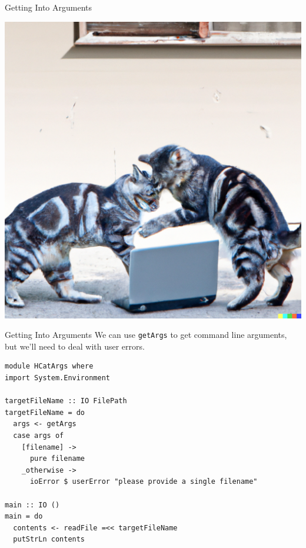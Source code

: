 \documentclass[10pt, presentation, colorlinks]{beamer}
\begin{document}
\begin{frame}[label={sec:org626e439}]{Getting Into Arguments}
\begin{center}
\includegraphics[height=0.6\textheight]{./img/arguments.png}
\end{center}
\end{frame}

\begin{frame}[label={sec:orgaeb0a64},fragile]{Getting Into Arguments}
 We can use \alert{\texttt{getArgs}} to get command line arguments, but we'll need to
deal with user errors.

\bigskip
\pause

\begin{verbatim}
module HCatArgs where
import System.Environment

targetFileName :: IO FilePath
targetFileName = do
  args <- getArgs
  case args of
    [filename] ->
      pure filename
    _otherwise ->
      ioError $ userError "please provide a single filename"

main :: IO ()
main = do
  contents <- readFile =<< targetFileName
  putStrLn contents
\end{verbatim}
\end{frame}
\end{document}
